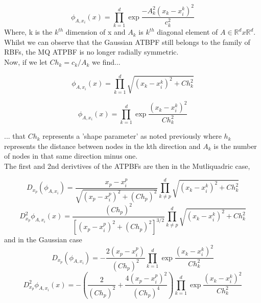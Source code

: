 \documentclass[a4paper]{amsart}
\begin{document}
\begin{equation}
\phi_{A,x_{i}}(x)= \prod^{d}_{k=1}\exp{\frac{-A^{2}_{k}(x_{k}-x^{k}_{i})^{2}}{ c^{2}_k}}
\end{equation}
Where, k is the $k^{th}$ dimension of x and $A_{k}$ is $k^{th}$ diagonal element of $A \in \mathbb{R}^{d} x \mathbb{R}^{d}$.\\

Whilst we can observe that the Gaussian ATBPF still belongs to the family of RBFs, the MQ ATPBF is no longer radially symmetric.\\

Now, if we let $Ch_{k} = c_{k} / A_{k}$ we find...

\begin{equation}
\phi_{A,x_{i}}(x)= \prod^{d}_{k=1}\sqrt{(x_{k}-x^{k}_{i})^{2}+Ch^{2}_k}
\end{equation}

\begin{equation}
\phi_{A,x_{i}}(x)= \prod^{d}_{k=1}\exp{\frac{(x_{k}-x^{k}_{i})^{2}}{ Ch^{2}_k}}
\end{equation}

... that $Ch_{k}$ represents a 'shape parameter' as noted previously where $h_{k}$ represents the distance between nodes in the kth direction and $A_{k}$ is the number of nodes in that same direction minus one.\\

The first and 2nd derivtives of the ATPBFs are then in the Mutliquadric case,

\begin{equation}
D_{x_{p}}(\phi_{A,x_{i}})=\frac{x_{p}-x^{p}_{i}}{\sqrt{(x_{p}-x^{p}_{i})^{2} + (Ch_{p})^2 }} \prod^{d}_{k\neq p}\sqrt{(x_{k}-x^{k}_{i})^{2}+Ch^{2}_k}
\end{equation}
\begin{equation}
D_{x_{p}}^{2}\phi_{A,x_{i}}(x)=\frac{(Ch_{p})^{2}}{[(x_{p}-x^{p}_{i})^{2} + (Ch_{p})^2 ]^{3/2}} \prod^{d}_{k\neq p}\sqrt{(x_{k}-x^{k}_{i})^{2}+Ch^{2}_k}
\end{equation}
and in the Gaussian case
\begin{equation}
D_{x_{p}}(\phi_{A,x_{i}})= -\frac{2(x_{p}-x^{p}_{i})}{(Ch_{p})^{2}} \prod^{d}_{k=1}\exp{\frac{(x_{k}-x^{k}_{i})^{2}}{ Ch^{2}_k}}
\end{equation}
\begin{equation}
D_{x_{p}}^{2}\phi_{A,x_{i}}(x)= -(\frac{2}{(Ch_{p})^{2}} + \frac{4(x_{p}-x^{p}_{i})^{2}}{(Ch_{p})^{4}}) \prod^{d}_{k=1}\exp{\frac{(x_{k}-x^{k}_{i})^{2}}{ Ch^{2}_k}}
\end{equation}
\end{document}
